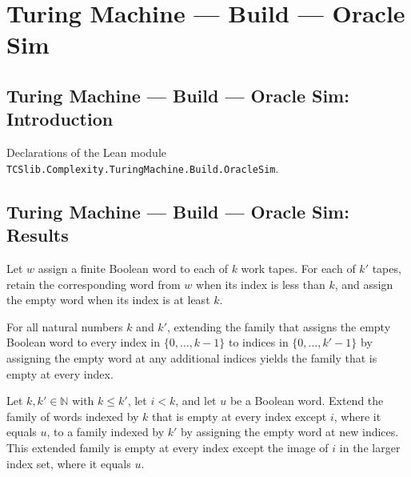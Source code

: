 \section{Turing Machine --- Build --- Oracle Sim}
\subsection*{Turing Machine --- Build --- Oracle Sim: Introduction}

Declarations of the Lean module \texttt{TCSlib.Complexity.TuringMachine.Build.OracleSim}.

\subsection*{Turing Machine --- Build --- Oracle Sim: Results}

\begin{definition}
\label{Turing.FinTM.prefixWords}
\leanok
Let $w$ assign a finite Boolean word to each of $k$ work tapes. For each of $k'$ tapes,
retain the corresponding word from $w$ when its index is less than $k$, and assign the
empty word when its index is at least $k$.
\end{definition}

\begin{theorem}
\label{Turing.FinTM.prefixWords_nil}
\leanok
{}
For all natural numbers $k$ and $k'$, extending the family that assigns the empty
Boolean word to every index in $\{0,\ldots,k-1\}$ to indices in $\{0,\ldots,k'-1\}$ by
assigning the empty word at any additional indices yields the family that is empty at
every index.
\end{theorem}

\begin{theorem}
\label{Turing.FinTM.prefixWords_update}
\leanok
{}
Let $k,k'\in\mathbb{N}$ with $k\le k'$, let $i<k$, and let $u$ be a Boolean word. Extend
the family of words indexed by $k$ that is empty at every index except $i$, where it
equals $u$, to a family indexed by $k'$ by assigning the empty word at new indices. This
extended family is empty at every index except the image of $i$ in the larger index set,
where it equals $u$.
\end{theorem}

